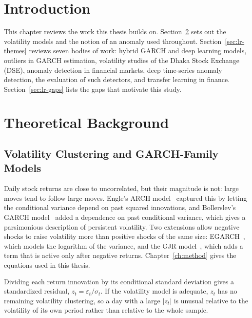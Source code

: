 
\section{Introduction}
This chapter reviews the work this thesis builds on. Section~\ref{sec:lr-theory} sets out
the volatility models and the notion of an anomaly used throughout. Section~\ref{sec:lr-themes}
reviews seven bodies of work: hybrid GARCH and deep learning models, outliers in GARCH
estimation, volatility studies of the Dhaka Stock Exchange (DSE), anomaly detection in
financial markets, deep time-series anomaly detection, the evaluation of such detectors,
and transfer learning in finance. Section~\ref{sec:lr-gaps} lists the gaps that motivate
this study.

\section{Theoretical Background}\label{sec:lr-theory}

\subsection{Volatility Clustering and GARCH-Family Models}
Daily stock returns are close to uncorrelated, but their magnitude is not: large moves
tend to follow large moves. Engle's ARCH model~\cite{engle1982autoregressive} captured this
by letting the conditional variance depend on past squared innovations, and
Bollerslev's GARCH model~\cite{bollerslev1986generalized} added a dependence on past
conditional variance, which gives a parsimonious description of persistent volatility.
Two extensions allow negative shocks to raise volatility more than positive shocks of the
same size: EGARCH~\cite{nelson1991conditional}, which models the logarithm of the variance,
and the GJR model~\cite{glosten1993relation}, which adds a term that is active only after
negative returns. Chapter~\ref{ch:method} gives the equations used in this thesis.

Dividing each return innovation by its conditional standard deviation gives a standardized
residual, $z_t = \varepsilon_t/\sigma_t$. If the volatility model is adequate, $z_t$ has no
remaining volatility clustering, so a day with a large $|z_t|$ is unusual relative to the
volatility of its own period rather than relative to the whole sample.

